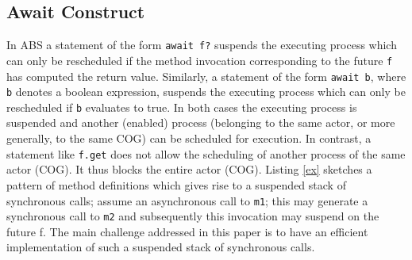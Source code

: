 





\subsection{Await Construct}
In ABS a statement of the form \lstinline|await f?|
suspends the executing process which can only be rescheduled if the method
invocation corresponding to the future \lstinline|f| has computed the return value.
Similarly, a statement of the form \lstinline|await b|, where \lstinline|b| denotes a boolean expression, suspends the executing process which can only be rescheduled if \lstinline|b| evaluates to true. In both cases the executing process is suspended and another (enabled) process (belonging to the same actor, or more generally, to the same COG) can be scheduled for execution.
In contrast, a statement like \lstinline|f.get| does not allow the scheduling of
another process of the same actor (COG). It thus blocks the entire actor (COG). Listing \ref{ex} sketches a pattern of method definitions which gives rise to a suspended stack of synchronous calls; assume an asynchronous call to \lstinline|m1|; this may generate a synchronous call to \lstinline|m2| and subsequently this invocation may suspend on the future f. The main challenge addressed in this paper is to have an efficient implementation of such a suspended stack of synchronous calls.

